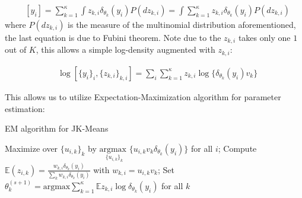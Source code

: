 \documentclass[12pt]{article}
\begin{document}
\begin{equation}
\begin{aligned}
& [ y_i ] =   \sum_{k=1}^{\kappa} \int z_{k,i} \delta_{\theta_{k}}(y_i) P(d z_{k,i}) = \int \sum_{k=1}^{\kappa} z_{k,i} \delta_{\theta_{k}}(y_i) P(d z_{k,i})
\end{aligned}
\end{equation}
where $P(d z_{k,i})$ is the measure of the multinomial distribution aforementioned, the last equation is due to Fubini theorem. Note due to the $z_{k,i}$ takes only one $1$ out of $K$, this allows a simple log-density augmented with $z_{k,i}$:

\begin{equation}
\begin{aligned}
& \log[ \{y_i\}_i, \{z_{k,i}\}_{k,i} ] =  \sum_{i}\sum_{k=1}^{\kappa} z_{k,i} \log \{\delta_{\theta_{k}}(y_i) v_k \}
\end{aligned}
\label{conditional_lik}
\end{equation}

 This allows us to utilize Expectation-Maximization algorithm for parameter estimation:

\begin{algorithm}[H]
\caption{EM algorithm for JK-Means}\label{alg:euclid}
\begin{algorithmic}[1]
\State Maximize over $\{ u_{i,k}\}_k$ by $ \underset{\{u_{i,k}\}_k} {\text{argmax }}\{u_{i,k}  v_{k}\delta_{\theta_{k}}(y_i)\}$ for all $i$; 
\State Compute $ \mathbb{E}(z_{i,k})= \frac{w_{k,i} \delta_{\theta_{k}}(y_i)}{\sum_k w_{k,i} \delta_{\theta_{k}}(y_i)}$ with $w_{k,i} = u_{i,k} v_{k}$; 
\State Set $\theta^{(s+1)}_{k}= \text{argmax} \sum_{k=1}^{\kappa} \mathbb{E}z_{k,i} \log \delta_{\theta_{k}}(y_i) $ for all $k$ 
\EndWhile\label{euclidendwhile}
\end{algorithmic}
\end{algorithm}




\end{document}
